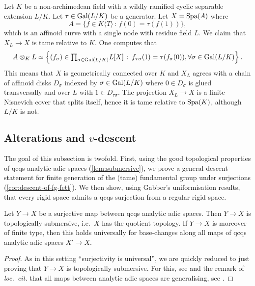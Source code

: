 \begin{ex} \label{ex:moregeneral-twisted-nodal-curve}
Let $K$ be a non-archimedean field with a wildly ramified cyclic separable extension $L/K$. Let $\tau \in \operatorname{Gal}(L/K)$ be a generator. Let $X=\operatorname{Spa}(A)$ where
\[
    A= \{f\in K\langle T\rangle\,:\, f(0) = \tau(f(1))\}, 
\]
which is an affinoid curve with a single node with residue field $L$. We claim that $X_L\to X$ is tame relative to $K$. 
One computes that 
\[
    A\otimes_K L \simeq \left\{(f_\sigma) \in {\textstyle \prod_{\sigma \in \operatorname{Gal}(L/K)}} L[X] \,:\, f_{\tau\sigma}(1)=\tau(f_{\sigma}(0)), \forall \sigma \in \operatorname{Gal}(L/K) \right\}.
    \]
This means that $X$ is geometrically connected over $K$ and $X_L$ agrees with a chain of affinoid disks $D_\sigma$ indexed by $\sigma \in \operatorname{Gal}(L/K)$ where $0 \in D_{\sigma}$ is glued transversally and over $L$ with $1 \in D_{\tau\sigma}$. The projection $X_L \to X$ is a finite Nisnevich cover that splits itself, hence it is tame relative to $\operatorname{Spa}(K)$, although $L/K$ is not. 
\end{ex}
    

\subsection{\texorpdfstring{Alterations and $v$-descent}{Alterations and v-descent}}
\label{ss:alterations-v-descent}

The goal of this subsection is twofold. First, using the good topological properties of qcqs analytic adic spaces (\cref{lem:submersive}), we prove a general descent statement for finite generation of the (tame) fundamental group under surjections (\cref{cor:descent-of-fg-fett}). We then show, using Gabber's uniformisation results, that every rigid space admits a qcqs surjection from a regular rigid space. 

\begin{lem} 
\label{lem:submersive}
    Let $Y\to X$ be a surjective map between qcqs analytic adic spaces. Then $Y\to X$ is topologically submersive, i.e.\ $X$ has the quotient topology. If $Y\to X$ is moreover of finite type, then this holds universally for base-changes along all maps of qcqs analytic adic spaces $X'\to X$. 
\end{lem}

\begin{proof}
As in this setting ``surjectivity is universal'', we are quickly reduced to just proving that $Y\to X$ is topologically submersive. For this, see \cite[Lemma~2.5]{ScholzeECoD} and the remark of \emph{loc.~cit.} that all maps between analytic adic spaces are generalising, see \cite[Lemma~1.1.10(v)]{HuberBook}. 
\end{proof}

